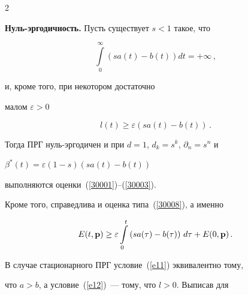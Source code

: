 \begin{multicols}{2}
\bigskip





{\bf Нуль-эргодичность.} Пусть существует $s<1$ такое, что


\begin{equation}


\int\limits_{0}^{\infty}\left(sa(t)-b(t)\right)dt=+\infty\,, \label{e11}


\end{equation} 


и, кроме того, при некотором достаточно


малом $\varepsilon > 0$ 


\begin{equation} 


l(t) \ge \varepsilon


\left(sa(t)-b(t)\right)\,. 


\label{e12} 


\end{equation}


Тогда ПРГ нуль-эргодичен и при $d=1$, $d_k=s^k$, ${\partial}_n =


s^n$ и 


$\beta^* (t)= \varepsilon


\left(1-s\right)\left(sa(t)-b(t)\right)$ 






выполняются оценки~(\ref{30001})--(\ref{30003}).





Кроме того, справедлива и оценка типа~(\ref{30008}), а именно


\begin{equation*}


 E(t,{\bf p}) \ge


 \varepsilon \int\limits_0^t   \left(sa(\tau)-b(\tau)\right)\,


d\tau  +  E(0,{\bf p})\,. 




\end{equation*}





В случае стационарного ПРГ  условие~(\ref{e11}) эквивалентно тому,


что $a > b$, а условие~(\ref{e12})~--- тому, что $l >0$. Выписав для



\end{multicols}

